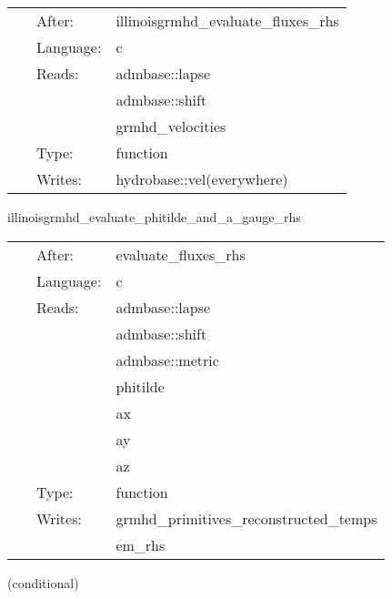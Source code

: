 \hspace{5mm}{\it convert needed hydrobase variables for nrpyleakage } 


\hspace{5mm}

 \begin{tabular*}{160mm}{cll} 
~ & After:  & illinoisgrmhd\_evaluate\_fluxes\_rhs \\ 
~ & Language:  & c \\ 
~ & Reads:  & admbase::lapse \\ 
~& ~ &admbase::shift\\ 
~& ~ &grmhd\_velocities\\ 
~ & Type:  & function \\ 
~ & Writes:  & hydrobase::vel(everywhere) \\ 
\end{tabular*} 


\vspace{5mm}


\hspace{5mm} illinoisgrmhd\_evaluate\_phitilde\_and\_a\_gauge\_rhs 

\hspace{5mm}{\it evaluate phitilde rhs and gauge contributions to a\_i rhs } 


\hspace{5mm}

 \begin{tabular*}{160mm}{cll} 
~ & After:  & evaluate\_fluxes\_rhs \\ 
~ & Language:  & c \\ 
~ & Reads:  & admbase::lapse \\ 
~& ~ &admbase::shift\\ 
~& ~ &admbase::metric\\ 
~& ~ &phitilde\\ 
~& ~ &ax\\ 
~& ~ &ay\\ 
~& ~ &az\\ 
~ & Type:  & function \\ 
~ & Writes:  & grmhd\_primitives\_reconstructed\_temps \\ 
~& ~ &em\_rhs\\ 
\end{tabular*} 


\vspace{5mm}

   (conditional) 

